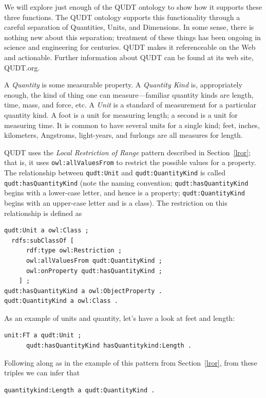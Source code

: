 We will explore just enough of the QUDT ontology to show how it supports
these three functions. The QUDT ontology supports this functionality
through a careful separation of Quantities, Units, and Dimensions. In
some sense, there is nothing new about this separation; treatment of
these things has been ongoing in science and engineering for centuries.
QUDT makes it referenceable on the Web and actionable. Further
information about QUDT can be found at its web site, QUDT.org.

A \emph{Quantity} is some measurable property. A \emph{Quantity Kind} is,
appropriately enough, the kind of thing one can measure---familiar
quantity kinds are length, time, mass, and force, etc. A \emph{Unit} is a
standard of measurement for a particular quantity kind. A foot is a unit
for measuring length; a second is a unit for measuring time. It is
common to have several units for a single kind; feet, inches,
kilometers, Angstroms, light-years, and furlongs are all measures for
length.

QUDT uses the \emph{Local Restriction of Range} pattern described in Section~\ref{lror}; that is, it uses
\texttt{owl:allValuesFrom} to restrict the possible values for a property. The
relationship between \texttt{qudt:Unit} and \texttt{qudt:QuantityKind} is called
\texttt{qudt:hasQuantityKind} (note the naming convention; \texttt{qudt:hasQuantityKind} begins
with a lower-case letter, and hence is a property; \texttt{qudt:QuantityKind}
begins with an upper-case letter and is a class). The restriction on
this relationship is defined as

\begin{lstlisting}
qudt:Unit a owl:Class ;
  rdfs:subClassOf [
      rdf:type owl:Restriction ;
      owl:allValuesFrom qudt:QuantityKind ;
      owl:onProperty qudt:hasQuantityKind ;
    ] ;
qudt:hasQuantityKind a owl:ObjectProperty .
qudt:QuantityKind a owl:Class .
\end{lstlisting}


As an example of units and quantity, let's have a look at feet and
length:

\begin{lstlisting}
unit:FT a qudt:Unit ;
      qudt:hasQuantityKind hasQuantitykind:Length .
\end{lstlisting}

Following along as in the example of this pattern from Section~\ref{lror}, from
these triples we can infer that

\begin{lstlisting}
quantitykind:Length a qudt:QuantityKind .
\end{lstlisting}

